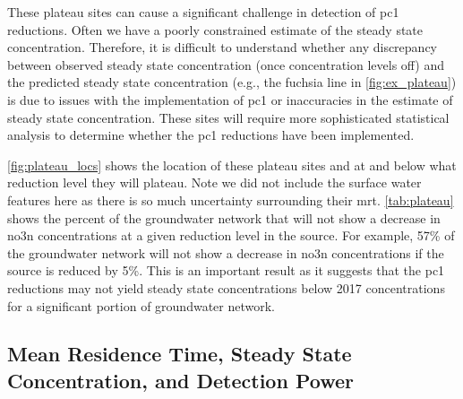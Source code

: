 
These plateau sites can cause a significant challenge in detection of \gls{pc1} reductions. Often we have a poorly constrained estimate of the steady state concentration. Therefore, it is difficult to understand whether any discrepancy between observed steady state concentration (once concentration levels off) and the predicted steady state concentration (e.g., the fuchsia line in \autoref{fig:ex_plateau}) is due to issues with the implementation of \gls{pc1} or inaccuracies in the estimate of steady state concentration. These sites will require more sophisticated statistical analysis to determine whether the \gls{pc1} reductions have been implemented.



\autoref{fig:plateau_locs} shows the location of these plateau sites and at and below what reduction level they will plateau. Note we did not include the surface water features here as there is so much uncertainty surrounding their \gls{mrt}.  \autoref{tab:plateau} shows the percent of the groundwater network that will not show a decrease in \gls{no3n} concentrations at a given reduction level in the source. For example, 57\% of the groundwater network will not show a decrease in \gls{no3n} concentrations if the source is reduced by 5\%. This is an important result as it suggests that the \gls{pc1} reductions may not yield steady state concentrations below 2017 concentrations for a significant portion of groundwater network.

\begin{landscape}
\end{landscape}

\subsection[Mean Residence Time Impacts]{Mean Residence Time, Steady State Concentration, and Detection Power} \label{sec:mrt_results}

